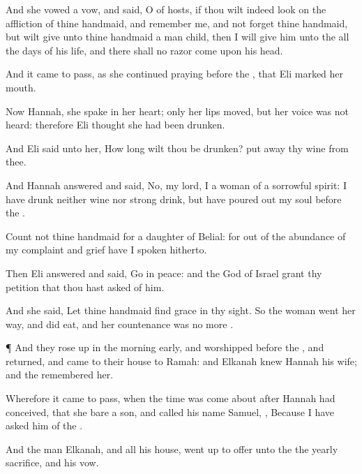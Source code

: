 {And she
vowed a
vow, and
said, O
{} of
hosts, if thou wilt
indeed
look on the
affliction of thine
handmaid, and
remember me, and not
forget thine
handmaid, but wilt
give unto thine
handmaid a
man
child, then I will
give him unto the
{} all the
days of his
life, and there shall no
razor
come upon his
head.

And it came to pass, as she
continued
praying
before the
{}, that
Eli
marked her
mouth.

Now
Hannah, she
spake in her
heart; only her
lips
moved, but her
voice was not
heard: therefore
Eli
thought she had been
drunken.

And
Eli
said unto her, How long wilt thou be
drunken? put
away thy
wine from thee.

And
Hannah
answered and
said, No, my
lord, I
{} a
woman of a
sorrowful
spirit: I have
drunk neither
wine nor strong
drink, but have poured
out my
soul
before the
{}.

Count not thine
handmaid
for a
daughter of
Belial: for out of the
abundance of my
complaint and
grief have I
spoken hitherto.

Then
Eli
answered and
said,
Go in
peace: and the
God of
Israel
grant
{} thy
petition that thou hast
asked of him.

And she
said, Let thine
handmaid
find
grace in thy
sight. So the
woman
went her
way, and did
eat, and her
countenance was no more
{}.


\par }{\PP {}¶ And they rose
up in the
morning
early, and
worshipped
before the
{}, and
returned, and
came to their
house to
Ramah: and
Elkanah
knew
Hannah his
wife; and the
{}
remembered her.

Wherefore it came to pass, when the
time was
come about after
Hannah had
conceived, that she
bare a
son, and
called his
name
Samuel,
{}, Because I have
asked him of the
{}.

And the
man
Elkanah, and all his
house, went
up to
offer unto the
{} the
yearly
sacrifice, and his
vow.

}
